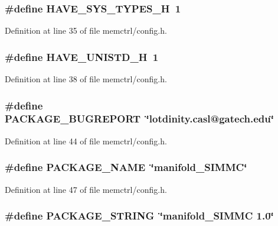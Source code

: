 \subsubsection[{HAVE\_\-SYS\_\-TYPES\_\-H}]{\setlength{\rightskip}{0pt plus 5cm}\#define HAVE\_\-SYS\_\-TYPES\_\-H~1}\label{memctrl_2config_8h_69dc70bea5d1f8bd2be9740e974fa666}




Definition at line 35 of file memctrl/config.h.
\subsubsection[{HAVE\_\-UNISTD\_\-H}]{\setlength{\rightskip}{0pt plus 5cm}\#define HAVE\_\-UNISTD\_\-H~1}\label{memctrl_2config_8h_219b06937831d0da94d801ab13987639}




Definition at line 38 of file memctrl/config.h.
\subsubsection[{PACKAGE\_\-BUGREPORT}]{\setlength{\rightskip}{0pt plus 5cm}\#define PACKAGE\_\-BUGREPORT~\char`\"{}lotdinity.casl@gatech.edu\char`\"{}}\label{memctrl_2config_8h_1d1d2d7f8d2f95b376954d649ab03233}




Definition at line 44 of file memctrl/config.h.
\subsubsection[{PACKAGE\_\-NAME}]{\setlength{\rightskip}{0pt plus 5cm}\#define PACKAGE\_\-NAME~\char`\"{}manifold\_\-SIMMC\char`\"{}}\label{memctrl_2config_8h_1c0439e4355794c09b64274849eb0279}




Definition at line 47 of file memctrl/config.h.
\subsubsection[{PACKAGE\_\-STRING}]{\setlength{\rightskip}{0pt plus 5cm}\#define PACKAGE\_\-STRING~\char`\"{}manifold\_\-SIMMC 1.0\char`\"{}}\label{memctrl_2config_8h_c73e6f903c16eca7710f92e36e1c6fbf}




